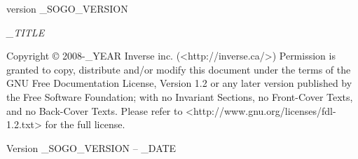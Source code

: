 \thispagestyle{empty}
\begin{figure}[htbp]
\end{figure}

\begin{flushright}
\vspace{2in}
{\selectfont \textmd{\Large version \_SOGO_VERSION}\par}
\bigskip
\textsl{\large \_TITLE}\\
\hspace{1.5cm}\hrulefill
\vfill
\end{flushright}
\newpage

Copyright ©  2008-\_YEAR Inverse inc. (<http://inverse.ca/>)
Permission is granted to copy, distribute and/or modify this document under the terms of the GNU Free Documentation License,
Version 1.2 or any later version published by the Free Software Foundation; with no Invariant Sections, no Front-Cover Texts, and no Back-Cover Texts.  
Please refer to <http://www.gnu.org/licenses/fdl-1.2.txt> for the full license.

Version \_SOGO_VERSION – \_DATE

\bigskip
\begin{flushright}
\end{flushright}
\newpage

